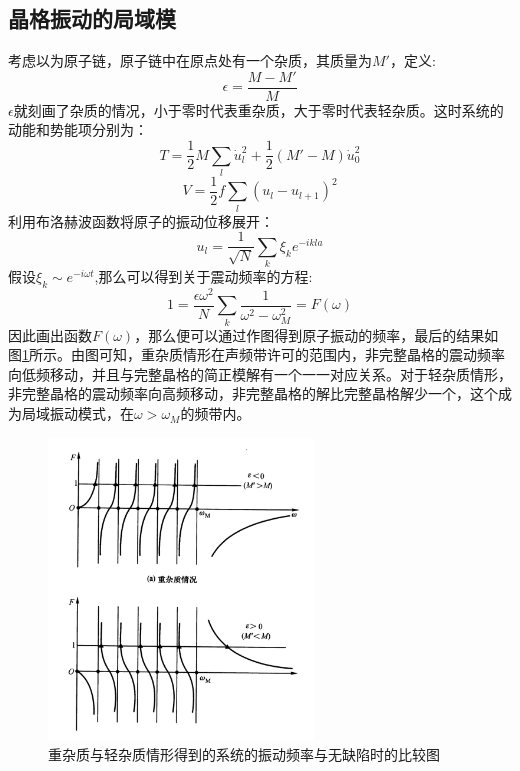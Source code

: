 \subsection{晶格振动的局域模}
考虑以为原子链，原子链中在原点处有一个杂质，其质量为$M'$，定义:
\[\epsilon=\frac{M-M'}{M}\]
$\epsilon$就刻画了杂质的情况，小于零时代表重杂质，大于零时代表轻杂质。这时系统的动能和势能项分别为：
\[T=\frac{1}{2}M\sum_{l}\dot{u}_l^2+\frac{1}{2}(M'-M)\dot{u}_0^2\]
\[V=\frac{1}{2}f\sum_l(u_l-u_{l+1})^2\]
利用布洛赫波函数将原子的振动位移展开：
\[u_l=\frac{1}{\sqrt{N}}\sum_k\xi_ke^{-ikla}\]
假设$\xi_k\sim e^{-i\omega t}$,那么可以得到关于震动频率的方程:
\[1=\frac{\epsilon \omega^2}{N}\sum_k\frac{1}{\omega^2-\omega_M^2}=F(\omega)\]
因此画出函数$F(\omega)$，那么便可以通过作图得到原子振动的频率，最后的结果如图\ref{fig:juyumo}所示。由图可知，重杂质情形在声频带许可的范围内，非完整晶格的震动频率向低频移动，并且与完整晶格的简正模解有一个一一对应关系。对于轻杂质情形，非完整晶格的震动频率向高频移动，非完整晶格的解比完整晶格解少一个，这个成为局域振动模式，在$\omega>\omega_M$的频带内。\par
\begin{figure}
\begin{center}
\includegraphics[height=8cm]{figures/juyumo.png}
\caption{重杂质与轻杂质情形得到的系统的振动频率与无缺陷时的比较图}
\label{fig:juyumo}
\end{center}
\end{figure}

